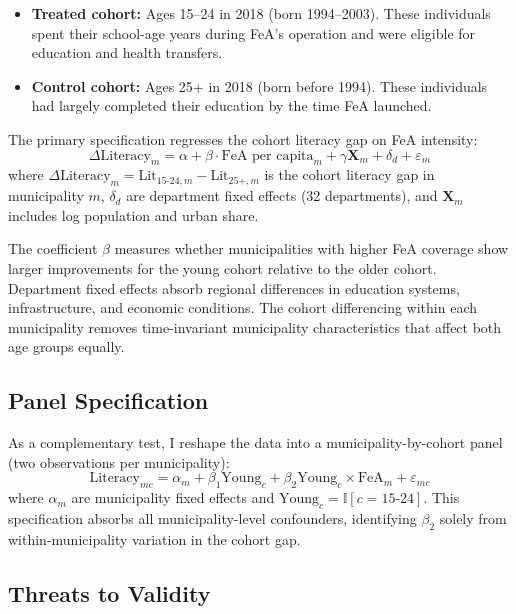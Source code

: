 \documentclass[12pt]{article}
\newcommand{\ind}{\mathbb{I}}
\begin{document}
\begin{itemize}
\item \textbf{Treated cohort:} Ages 15--24 in 2018 (born 1994--2003). These individuals spent their school-age years during FeA's operation and were eligible for education and health transfers.
\item \textbf{Control cohort:} Ages 25+ in 2018 (born before 1994). These individuals had largely completed their education by the time FeA launched.
\end{itemize}

The primary specification regresses the cohort literacy gap on FeA intensity:
\begin{equation}
\Delta \text{Literacy}_m = \alpha + \beta \cdot \text{FeA per capita}_m + \gamma \mathbf{X}_m + \delta_d + \varepsilon_m
\label{eq:gap}
\end{equation}
where $\Delta \text{Literacy}_m = \text{Lit}_{15\text{-}24,m} - \text{Lit}_{25+,m}$ is the cohort literacy gap in municipality $m$, $\delta_d$ are department fixed effects (32 departments), and $\mathbf{X}_m$ includes log population and urban share.

The coefficient $\beta$ measures whether municipalities with higher FeA coverage show larger improvements for the young cohort relative to the older cohort. Department fixed effects absorb regional differences in education systems, infrastructure, and economic conditions. The cohort differencing within each municipality removes time-invariant municipality characteristics that affect both age groups equally.

\subsection{Panel Specification}

As a complementary test, I reshape the data into a municipality-by-cohort panel (two observations per municipality):
\begin{equation}
\text{Literacy}_{mc} = \alpha_m + \beta_1 \text{Young}_c + \beta_2 \text{Young}_c \times \text{FeA}_m + \varepsilon_{mc}
\label{eq:panel}
\end{equation}
where $\alpha_m$ are municipality fixed effects and $\text{Young}_c = \ind[c = 15\text{-}24]$. This specification absorbs all municipality-level confounders, identifying $\beta_2$ solely from within-municipality variation in the cohort gap.

\subsection{Threats to Validity}
\end{document}
